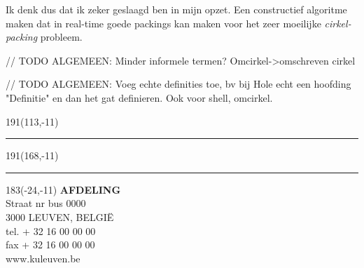 \documentclass[12pt,a4paper,oneside]{book}
\begin{document}
Ik denk dus dat ik zeker geslaagd ben in mijn opzet.
Een constructief algoritme maken dat in real-time goede packings kan maken voor het zeer moeilijke \textit{cirkel-packing} probleem.

// TODO ALGEMEEN: Minder informele termen? Omcirkel->omschreven cirkel

// TODO ALGEMEEN: Voeg echte definities toe, bv bij Hole echt een hoofding "Definitie" en dan het gat definieren. Ook voor shell, omcirkel.

\newpage




\newpage

\thispagestyle{empty}
\sffamily
%
\begin{textblock}{191}(113,-11)
{\color{blueline}\rule{160pt}{5.5pt}}
\end{textblock}
%
\begin{textblock}{191}(168,-11)
{\color{blueline}\rule{5.5pt}{59pt}}
\end{textblock}
%
\begin{textblock}{183}(-24,-11)
\textblockcolour{}
\flushright
\fontsize{7}{7.5}\selectfont
\textbf{AFDELING}\\
Straat nr bus 0000\\
3000 LEUVEN, BELGI\"{E}\\
tel. + 32 16 00 00 00\\
fax + 32 16 00 00 00\\
www.kuleuven.be\\
\end{textblock}
%
\end{document}
